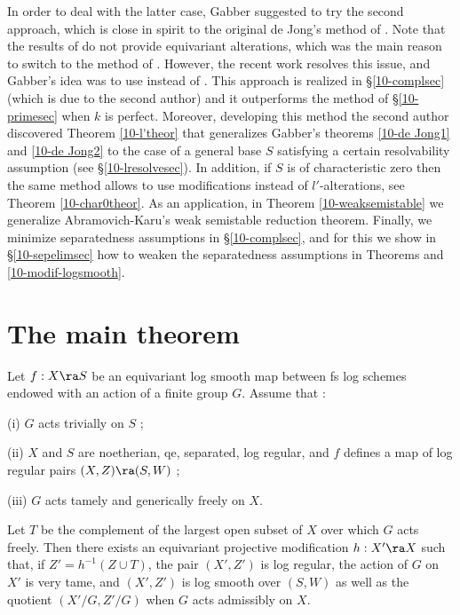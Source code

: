 \documentclass[10pt]{../fichiers-configuration-latex/smfart}
\begin{document}
In order to deal with the latter case, Gabber suggested to try the second
approach, which is close in spirit to the original de Jong's method of
\cite{Alterations@de_Jong}. Note that the results of \cite{Alterations@de_Jong}
do not provide equivariant alterations, which was the main reason to switch to
the method of \cite{Families@de_Jong}. However, the recent work \cite{Temkin@stable}
resolves this issue, and Gabber's idea was to use \cite{Temkin@stable} instead of
\cite{Alterations@de_Jong}. This approach is realized in \S\ref{10-complsec}
(which is due to the second author) and it outperforms the method of \S\ref{10-primesec}
when $k$ is perfect. Moreover, developing this method the second author discovered
Theorem \ref{10-l'theor} that generalizes Gabber's theorems \ref{10-de Jong1} and
\ref{10-de Jong2} to the case of a general base $S$ satisfying a certain resolvability
assumption (see \S\ref{10-lresolvesec}). In addition, if $S$ is of characteristic zero
then the same method allows to use modifications instead of $l'$-alterations, see
Theorem \ref{10-char0theor}. As an application, in Theorem \ref{10-weaksemistable}
we generalize Abramovich-Karu's weak semistable reduction theorem. Finally,
we minimize separatedness assumptions in \S\ref{10-complsec}, and for this we show
in \S\ref{10-sepelimsec} how to weaken the separatedness assumptions in Theorems
 and \ref{10-modif-logsmooth}.

\section{The main theorem}

\begin{theorem}[Gabber]\label{10-modif-logsmooth}
Let $f : X \ra S$ be an equivariant log smooth map between fs log schemes
endowed with an action of a finite group $G$. Assume that :

(i) $G$ acts trivially on $S$ ;

(ii) $X$ and $S$ are noetherian, qe, separated, log regular, and $f$ defines a
map of log regular pairs $(X,Z) \ra (S,W)$ ;

(iii) $G$ acts tamely and generically freely on $X$.

Let $T$ be the complement of the largest open subset of $X$ over which $G$
acts freely. Then there exists an equivariant projective modification $h :
X' \ra X$ such that, if $Z' = h^{-1}(Z \cup T)$, the pair $(X',Z')$ is log
regular, the action of $G$ on $X'$ is very tame, and $(X',Z')$ is log smooth
over $(S,W)$ as well as the quotient $(X'/G,Z'/G)$ when $G$ acts admissibly
on $X$.
\end{theorem}
\end{document}
